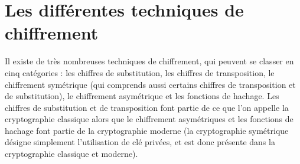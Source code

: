\chapter{Les différentes techniques de
chiffrement\label{chap:Techniques}}
Il existe de très nombreuses techniques de chiffrement, qui
peuvent se classer en cinq catégories : les chiffres de
substitution, les chiffres de transposition, le chiffrement
symétrique (qui comprends aussi certains chiffres de transposition
et de substitution), le chiffrement asymétrique et les fonctions de
hachage.
Les chiffres de substitution et de transposition font partie de ce
que l'on appelle la cryptographie classique alors que le
chiffrement asymétriques et les fonctions de hachage
font partie de la cryptographie moderne (la cryptographie
symétrique désigne simplement l'utilisation de clé privées, et
est donc présente dans la cryptographie classique et moderne).











